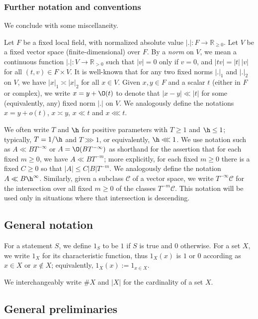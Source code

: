 \subsubsection{Further notation and conventions}\label{sec:furth-notat-conv}
We conclude with some miscellaneity.

Let $F$ be a fixed local field, with normalized absolute value $|.| : F \rightarrow \mathbb{R}_{\geq 0}$.  Let $V$ be a fixed vector space (finite-dimensional) over $F$.  By a \emph{norm} on $V$, we mean a continuous function $|.| : V \rightarrow \mathbb{R}_{>0}$ such that $|v| = 0$ only if $v = 0$, and $|t v| = |t|\, |v|$ for all $(t,v) \in F \times V$.  It is well-known that for any two fixed norms $|.|_1$ and $|.|_2$ on $V$, we have $|x|_1 \asymp |x|_2$ for all $x \in V$.  Given $x,y \in F$ and a scalar $t$ (either in $F$ or complex), we write $x = y + \O(t)$ to denote that $|x-y| \ll |t|$ for some (equivalently, any) fixed norm $|.|$ on $V$.  We analogously define the notations $x = y + o(t)$, $x \asymp y$, $x \ll t$ and $x \lll t$.

We often write $T$ and $\h$ for positive parameters with $T \geq 1$ and $\h \leq 1$; typically, $T = 1/\h$ and $T \ggg 1$, or equivalently, $\h \lll 1$.  We use notation such as $A \ll B T^{-\infty}$ or $A = \O(B T^{-\infty})$ as shorthand for the assertion that for each fixed $m \geq 0$, we have $A \ll B T^{-m}$; more explicitly, for each fixed $m \geq 0$ there is a fixed $C \geq 0$ so that $|A| \leq C |B| T^{-m}$.  We analogously define the notation $A \ll B \h^\infty$.  Similarly, given a subclass $\mathcal{C}$ of a vector space, we write $T^{-\infty} \mathcal{C}$ for the intersection over all fixed $m \geq 0$ of the classes $T^{-m} \mathcal{C}$.  This notation will be used only in situations where that intersection is descending.

\subsection{General notation}
For a statement $S$, we define $1_S$ to be $1$ if $S$ is true and $0$ otherwise.  For a set $X$, we write $1_X$ for its characteristic function, thus $1_X(x)$ is $1$ or $0$ according as $x \in X$ or $x \notin X$; equivalently, $1_X(x) := 1_{x \in X}$.

We interchangeably write $\# X$ and $|X|$ for the cardinality of a set $X$.


\subsection{General preliminaries}\label{sec:gener-prel}


